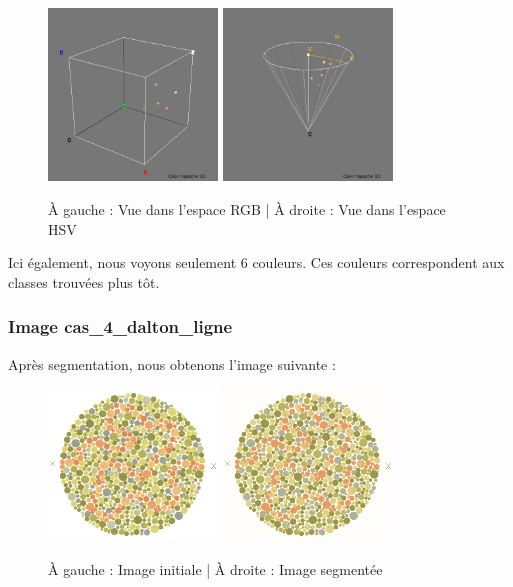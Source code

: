 \documentclass[a4paper]{article}
\begin{document}
\begin{figure}[H]
\begin{center}
  \includegraphics[width=170px]{../resultats/cas_4_dalton45_rgb.png}
\includegraphics[width=170px]{../resultats/cas_4_dalton45_hsv.png}
\end{center}
\caption{À gauche : Vue dans l'espace RGB | À droite : Vue dans l'espace HSV}
\end{figure}

Ici également, nous voyons seulement 6 couleurs. Ces couleurs correspondent aux classes trouvées plus tôt.

\clearpage
\subsubsection{Image cas\_4\_dalton\_ligne}

Après segmentation, nous obtenons l'image suivante :

\begin{figure}[H]
\begin{center}
\includegraphics[width=170px]{../base/cas_4_dalton_ligne.png}
\includegraphics[width=170px]{../resultats/cas_4_dalton_ligne.png}
\end{center}
\caption{À gauche : Image initiale | À droite : Image segmentée}
\end{figure}
\end{document}
